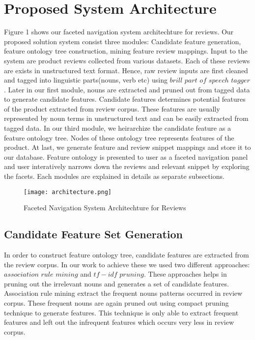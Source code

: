 \section{Proposed System Architecture}\label{sec:algorithms}
Figure 1 shows our faceted navigation system architechture for reviews. Our proposed solution system consist three modules: Candidate feature generation, feature ontology tree construction, mining feature review mappings. Input to the system are product reviews collected from various datasets. Each of these reviews are exists in unstructured text format. Hence, raw review inputs are first cleaned and tagged into linguistic parts(nouns, verb etc) using $brill$ $part$ $of$ $speech$ $tagger$\cite{brill1992simple}. Later in our first module, nouns are extracted and pruned out from tagged data to generate candidate features. Candidate features determines potential features of the product extracted from review corpus. These features are usually represented by noun terms in unstructured text and can be easily extracted from tagged data. In our third module, we heirarchize the candidate feature as a feature ontology tree. Nodes of these ontology tree represents features of the product. At last, we generate feature and review snippet mappings and store it to our database. Feature ontology is presented to user as a faceted navigation panel and user interatively narrows down the reviews and relevant snippet by exploring the facets. Each modules are explained in details as separate subsections.

\begin{figure}[h!]
\texttt{[image: architecture.png]}
\caption{Faceted Navigation System Architechture for Reviews \label{overflow}}
\end{figure}


\subsection{Candidate Feature Set Generation}
In order to construct feature ontology tree, candidate features are extracted from the review corpus. In our work to achieve these we used two different approaches: $association$ $rule$ $mining$\cite{hu2004mining} and $tf-idf$ $pruning$. These approaches helps in pruning out the irrelevant nouns and generates a set of candidate features. Association rule mining extract the frequent nouns patterns occurred in review corpus. These frequent nouns are again pruned out using compact pruning technique to generate features. This technique is only able to extract frequent features and left out the infrequent features which occurs very less in review corpus.

